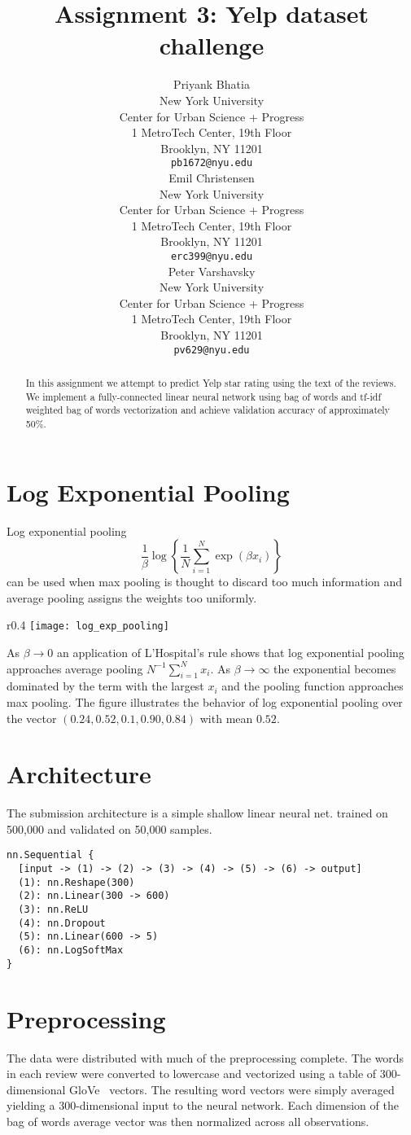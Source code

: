 \documentclass{article} %
\title{Assignment 3: Yelp dataset challenge}
\author{
Priyank Bhatia \\
New York University \\
Center for Urban Science + Progress \\
1 MetroTech Center, 19th Floor \\
Brooklyn, NY 11201 \\
\texttt{pb1672@nyu.edu} \\
\AND
Emil Christensen \\
New York University \\
Center for Urban Science + Progress \\
1 MetroTech Center, 19th Floor \\
Brooklyn, NY 11201 \\
\texttt{erc399@nyu.edu} \\
\And
Peter Varshavsky \\
New York University \\
Center for Urban Science + Progress \\
1 MetroTech Center, 19th Floor \\
Brooklyn, NY 11201 \\
\texttt{pv629@nyu.edu} \\
}
\begin{document}
\maketitle


\begin{abstract}
In this assignment we attempt to predict Yelp star rating using the text of the reviews. We implement a fully-connected linear neural network using bag of words and tf-idf weighted bag of words vectorization and achieve validation accuracy of approximately 50\%.\end{abstract}

\section{Log Exponential Pooling}
Log exponential pooling
\[
\frac{1}{\beta}\log\left\{
	\frac{1}{N}
	\sum_{i=1}^N
	\exp\left(\beta x_i \right)
	\right\}
\]
can be used when max pooling is thought to discard too much information and average pooling assigns the weights too uniformly.
\begin{wrapfigure}{r}{0.4\textwidth}
\texttt{[image: log\_exp\_pooling]}
\end{wrapfigure}
As $\beta \rightarrow 0$ an application of L'Hospital's rule shows that log exponential pooling approaches average pooling $N^{-1}\sum_{i=1}^N x_i$.
As $\beta \rightarrow \infty$ the exponential becomes dominated by the term with the largest $x_i$ and the pooling function approaches max pooling.
The figure illustrates the behavior of log exponential pooling over the vector $(0.24, 0.52, 0.1, 0.90, 0.84)$ with mean $0.52$.

\section{Architecture}
\label{arc}

The submission architecture is a simple shallow linear neural net. trained on 500,000 and validated on 50,000 samples.
\begin{lstlisting}
nn.Sequential {
  [input -> (1) -> (2) -> (3) -> (4) -> (5) -> (6) -> output]
  (1): nn.Reshape(300)
  (2): nn.Linear(300 -> 600)
  (3): nn.ReLU
  (4): nn.Dropout
  (5): nn.Linear(600 -> 5)
  (6): nn.LogSoftMax
}

\end{lstlisting}

\section{Preprocessing}
\label{preproc}
The data were distributed with much of the preprocessing complete.
The words in each review were converted to lowercase and vectorized using a table of 300-dimensional GloVe~\cite{pennington14} vectors.
The resulting word vectors were simply averaged yielding a 300-dimensional input to the neural network. Each dimension of the bag of words average vector was then normalized across all observations.
\end{document}
